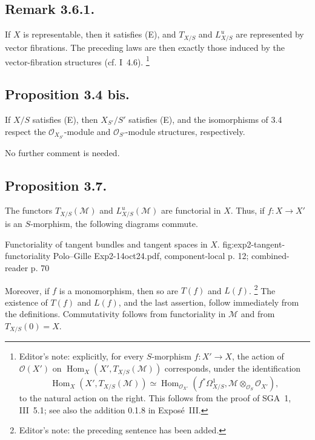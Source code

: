 \subsection*{Remark 3.6.1.}
If \(X\) is representable, then it satisfies (E), and \(T_{X/S}\) and
\(L^u_{X/S}\) are represented by vector fibrations. The preceding laws
are then exactly those induced by the vector-fibration structures
(cf. I~4.6).
\footnote{Editor's note: explicitly, for every \(S\)-morphism
\(f:X'\to X\), the action of \(\mathcal O(X')\) on
\(\operatorname{Hom}_X(X',T_{X/S}(\mathcal M))\) corresponds, under the
identification
\[
  \operatorname{Hom}_X(X',T_{X/S}(\mathcal M))
  \simeq
  \operatorname{Hom}_{\mathcal O_{X'}}
    (f^*\Omega^1_{X/S},\mathcal M\otimes_{\mathcal O_S}\mathcal O_{X'}),
\]
to the natural action on the right. This follows from the proof of SGA~1,
III~5.1; see also the addition 0.1.8 in Expos\'e~III.}

\subsection*{Proposition 3.4 bis.}
If \(X/S\) satisfies (E), then \(X_{S'}/S'\) satisfies (E), and the
isomorphisms of 3.4 respect the \(\mathcal O_{X_{S'}}\)-module and
\(\mathcal O_{S'}\)-module structures, respectively.

No further comment is needed.

\subsection*{Proposition 3.7.}
The functors \(T_{X/S}(\mathcal M)\) and \(L^u_{X/S}(\mathcal M)\) are
functorial in \(X\). Thus, if \(f:X\to X'\) is an \(S\)-morphism, the
following diagrams commute.

  {Functoriality of tangent bundles and tangent spaces in \(X\).}
  {fig:exp2-tangent-functoriality}
  {Polo--Gille Exp2-14oct24.pdf, component-local p. 12; combined-reader p. 70}

Moreover, if \(f\) is a monomorphism, then so are \(T(f)\) and \(L(f)\).
\footnote{Editor's note: the preceding sentence has been added.}
The existence of \(T(f)\) and \(L(f)\), and the last assertion, follow
immediately from the definitions. Commutativity follows from functoriality
in \(\mathcal M\) and from \(T_{X/S}(0)=X\).

